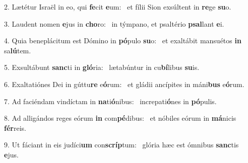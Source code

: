 2. Lætétur Israël in eo, qui \textbf{fe}cit \textbf{e}um: \ast\  et fílii Sion exsúltent in \textbf{re}ge \textbf{su}o.\

3. Laudent nomen \textbf{e}jus in \textbf{cho}ro: \ast\  in týmpano, et psaltério \textbf{psal}lant \textbf{e}i.\

4. Quia beneplácitum est Dómino in \textbf{pó}pulo \textbf{su}o: \ast\  et exaltábit mansuétos \textbf{in} sa\textbf{lú}tem.\

5. Exsultábunt \textbf{sanc}ti in \textbf{gló}ria: \ast\  lætabúntur in cu\textbf{bí}libus \textbf{su}is.\

6. Exaltatiónes Dei in gúttu\textbf{re} e\textbf{ó}rum: \ast\  et gládii ancípites in máni\textbf{bus} e\textbf{ó}rum.\

7. Ad faciéndam vindíctam in \textbf{na}ti\textbf{ó}nibus: \ast\  increpati\textbf{ó}nes in \textbf{pó}pulis.\

8. Ad alligándos reges eórum \textbf{in} com\textbf{pé}dibus: \ast\  et nóbiles eórum in \textbf{má}nicis \textbf{fér}reis.\

9. Ut fáciant in eis judíci\textbf{um} con\textbf{scríp}tum: \ast\  glória hæc est ómnibus \textbf{sanc}tis \textbf{e}jus.\

